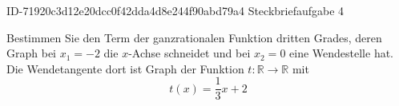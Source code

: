 \begin{exercise}
      {ID-71920c3d12e20dcc0f42dda4d8e244f90abd79a4}
      {Steckbriefaufgabe 4}
  \ifproblem\problem\par
    Bestimmen Sie den Term der ganzrationalen Funktion dritten Grades, deren
    Graph bei $x_1=\num{-2}$ die $x$-Achse schneidet und bei $x_2=\num{0}$
    eine Wendestelle hat. Die Wendetangente dort ist Graph der Funktion
    $t:\mathbb{R}\to\mathbb{R}$ mit
    \begin{equation*}
      t(x)=\frac{1}{3}x+2
    \end{equation*}
  \fi
\end{exercise}
